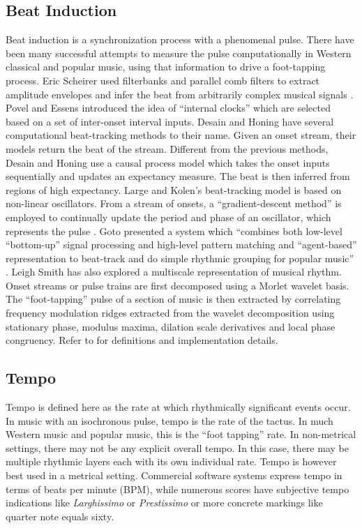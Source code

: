 \vspace{5mm}
\subsection{Beat Induction}

Beat induction is a synchronization process with a phenomenal pulse.  
There have been many successful attempts to measure the pulse 
computationally in Western classical and popular music, using that 
information to drive a foot-tapping process.  
Eric Scheirer used filterbanks and parallel comb filters to extract
amplitude envelopes and infer the beat from arbitrarily complex 
musical signals \cite{Scheirer:98tempo}.  Povel and Essens introduced 
the idea of ``internal clocks'' which are selected based on a set of 
inter-onset interval inputs. Desain and Honing have several computational beat-tracking 
methods to their name. Given an onset stream, their models 
return the beat of the stream. Different from the 
previous methods, Desain and Honing use a causal process model which takes the
onset inputs sequentially and updates an expectancy measure.  The
beat is then inferred from regions of high expectancy. Large and Kolen's
beat-tracking model is based on non-linear oscillators. From a stream
of onsets, a ``gradient-descent method'' is employed to continually
update the period and phase of an oscillator, which represents the
pulse \cite{Large:94}\cite{Scheirer:98tempo}. Goto presented a system 
which ``combines both low-level ``bottom-up'' signal processing and 
high-level pattern matching and ``agent-based'' representation to 
beat-track and do simple rhythmic grouping for popular music''
\cite{Scheirer:98tempo}\cite{Goto:98}. Leigh Smith has also explored a
multiscale representation of musical rhythm. Onset streams or pulse
trains are first decomposed using a Morlet wavelet basis. The
``foot-tapping'' pulse of a section of music is then extracted by 
correlating frequency modulation ridges extracted from the wavelet
decomposition using stationary phase, modulus maxima, dilation scale 
derivatives and local phase congruency. Refer to \cite{Smith:99} for 
definitions and implementation details.

\vspace{5mm}
\subsection{Tempo}
Tempo is defined here as the rate at which rhythmically significant
events occur. In music with an isochronous pulse, tempo is the rate of
the tactus. In much Western music and popular music, this is the ``foot
tapping'' rate. In non-metrical settings, there may not be any explicit
overall tempo. In this case, there may be multiple rhythmic layers
each with its own individual rate. Tempo is however best used in a 
metrical setting. Commercial software systems express tempo in terms 
of beats per minute (BPM), while numerous scores have subjective tempo 
indications like {\it Larghissimo} or {\it Prestissimo} or more
concrete markings like quarter note equals sixty.

